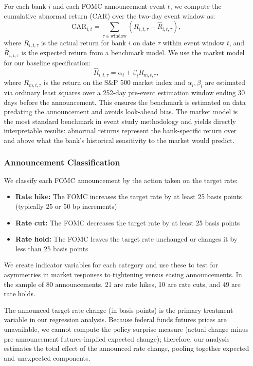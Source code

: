 \documentclass{article}
\begin{document}
For each bank $i$ and each FOMC announcement event $t$, we compute the cumulative abnormal return (CAR) over the two-day event window as:
\begin{equation}
\mathrm{CAR}_{i,t} = \sum_{\tau \in \text{window}} \left( R_{i,t,\tau} - \hat{R}_{i,t,\tau} \right),
\end{equation}
where $R_{i,t,\tau}$ is the actual return for bank $i$ on date $\tau$ within event window $t$, and $\hat{R}_{i,t,\tau}$ is the expected return from a benchmark model. We use the market model for our baseline specification:
\begin{equation}
\hat{R}_{i,t,\tau} = \alpha_i + \beta_i R_{m,t,\tau},
\end{equation}
where $R_{m,t,\tau}$ is the return on the S\&P 500 market index and $\alpha_i, \beta_i$ are estimated via ordinary least squares over a 252-day pre-event estimation window ending 30 days before the announcement. This ensures the benchmark is estimated on data predating the announcement and avoids look-ahead bias. The market model is the most standard benchmark in event study methodology and yields directly interpretable results: abnormal returns represent the bank-specific return over and above what the bank's historical sensitivity to the market would predict.

\subsubsection{Announcement Classification}

We classify each FOMC announcement by the action taken on the target rate:
\begin{itemize}
\item \textbf{Rate hike:} The FOMC increases the target rate by at least 25 basis points (typically 25 or 50 bp increments)
\item \textbf{Rate cut:} The FOMC decreases the target rate by at least 25 basis points
\item \textbf{Rate hold:} The FOMC leaves the target rate unchanged or changes it by less than 25 basis points
\end{itemize}

We create indicator variables for each category and use these to test for asymmetries in market responses to tightening versus easing announcements. In the sample of 80 announcements, 21 are rate hikes, 10 are rate cuts, and 49 are rate holds.

The announced target rate change (in basis points) is the primary treatment variable in our regression analysis. Because federal funds futures prices are unavailable, we cannot compute the policy surprise measure (actual change minus pre-announcement futures-implied expected change); therefore, our analysis estimates the total effect of the announced rate change, pooling together expected and unexpected components.
\end{document}

